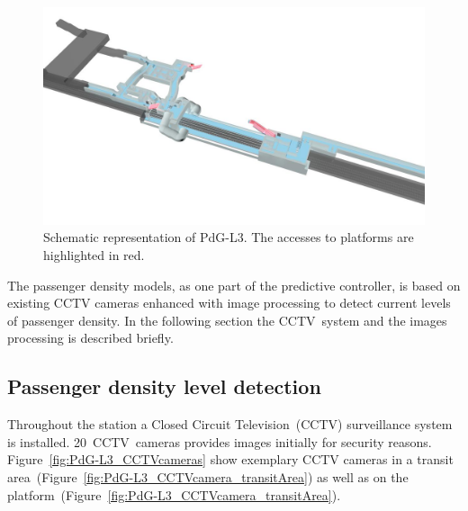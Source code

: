 \begin{figure}[htb]
  \centering
  \includegraphics[width=\linewidth]{Figures/PdG-L3_schematic.jpg} 
  \caption{Schematic representation of PdG-L3. The accesses to platforms are highlighted in red. \cite{TMB}}
  \label{fig:PdG-L3_schematic}
\end{figure}

The passenger density models, as one part of the predictive controller, is based on existing CCTV cameras enhanced with image processing to detect current levels of passenger density. In the following section the CCTV~system and the images processing is described briefly.


\subsection{Passenger density level detection}
\label{subsec:PassengerDensityLevelExtraction}

Throughout the station a Closed Circuit Television~(CCTV) surveillance system is installed. 20~CCTV~cameras provides images initially for security reasons. Figure~\ref{fig:PdG-L3_CCTVcameras} show exemplary CCTV cameras in a transit area~(Figure~\ref{fig:PdG-L3_CCTVcamera_transitArea}) as well as on the platform~(Figure~\ref{fig:PdG-L3_CCTVcamera_transitArea}).

